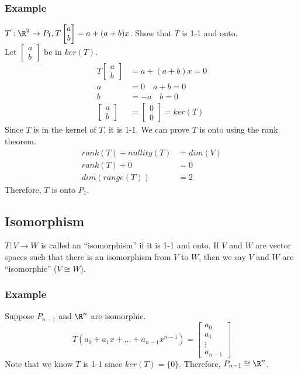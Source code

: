 \documentclass{math}
\begin{document}
\subsubsection*{Example}
\( T:\R^2\to P_1, T\begin{bmatrix}a \\ b\end{bmatrix} = a+(a+b)x \). Show that
\( T \) is 1-1 and onto. \\
Let \( \begin{bmatrix}a \\ b\end{bmatrix} \) be in \( ker(T) \).
\begin{align*}
  T\begin{bmatrix}a \\ b\end{bmatrix} &= a+(a+b)x = 0 \\
  a &= 0 \quad a+b = 0 \\
  b &= -a \quad b = 0 \\
  \begin{bmatrix}a \\ b\end{bmatrix} &= \begin{bmatrix}0 \\ 0\end{bmatrix} =
    ker(T)
\end{align*}
Since \( T \) is in the kernel of \( T \), it is 1-1. We can prove \( T \) is
onto using the rank theorem.
\begin{align*}
  rank(T)+nullity(T) &= dim(V) \\
  rank(T)+0 &= 0 \\
  dim(range(T)) &= 2
\end{align*}
Therefore, \( T \) is onto \( P_1 \).

\subsection*{Isomorphism}
\( T:V\to W \) is called an ``isomorphism'' if it is 1-1 and onto. If \( V \)
and \( W \) are vector spaces such that there is an isomorphism from \( V \) to
\( W \), then we say \( V \) and \( W \) are ``isomorphic'' (\( V\cong W \)).

\subsubsection*{Example}
Suppose \( P_{n-1} \) and \( \R^n \) are isomorphic.
\[ T(a_0+a_1x+\dots+a_{n-1}x^{n-1}) = \begin{bmatrix}a_0 \\ a_1 \\ \vdots \\
  a_{n-1}\end{bmatrix} \]
Note that we know \( T \) is 1-1 since \( ker(T) = \{0\} \). Therefore,
\( P_{n-1} \cong \R^n \).
\end{document}
